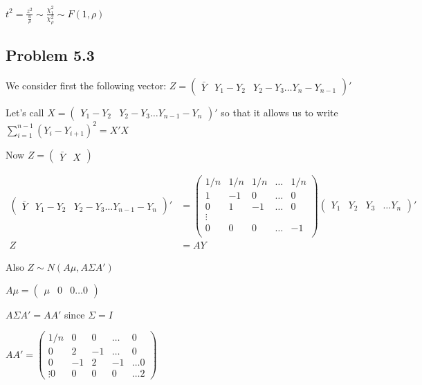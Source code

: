 \documentclass[a4paper]{article}
\begin{document}
$t^2 = \frac{z^2}{{\frac{u}{\rho}}} \sim \frac{\chi_1^2}{\chi_\rho^2} \sim F(1,\rho)$

\subsection*{Problem 5.3}
We consider first the following vector:
$Z=\begin{pmatrix} \bar{Y} & Y_1-Y_2 & Y_2-Y_3 \dots Y_n-Y_{n-1}\end{pmatrix}'$

Let's call $X = \begin{pmatrix} Y_1-Y_2 & Y_2-Y_3 \dots Y_{n-1}-Y_{n}\end{pmatrix}'$ so that it allows us to write $\sum_{i=1}^{n-1}(Y_i-Y_{i+1})^2=X'X$ 

Now $Z=\begin{pmatrix} \bar{Y} & X \end{pmatrix}$


\begin{align*}
\begin{pmatrix} \bar{Y} & Y_1-Y_2 & Y_2-Y_3 \dots Y_{n-1}-Y_{n}\end{pmatrix}' &= \begin{pmatrix}
1/n & 1/n & 1/n & \dots & 1/n\\
1 & -1 &  0 & \dots & 0\\
0 & 1 & -1 & \dots & 0\\
\vdots \\
0 & 0 & 0 & \dots & -1\\
\end{pmatrix} \begin{pmatrix} Y_1 & Y_2 & Y_3 &\dots Y_n \end{pmatrix}'\\
Z &= AY
\end{align*}

Also $Z \sim N(A\mu, A\Sigma A')$

$A\mu = \begin{pmatrix} \mu  & 0 & 0 \dots 0 \end{pmatrix}$

$A\Sigma A' = AA'$ since $\Sigma = I$

$AA'  = \begin{pmatrix} 1/n & 0 & 0 & \dots & 0\\ 
0 & 2 & -1  & \dots & 0\\
0 & -1 & 2 & -1 & \dots 0\\
\vdots 
0 & 0 & 0 & 0 & \dots 2
\end{pmatrix}$
\end{document}
